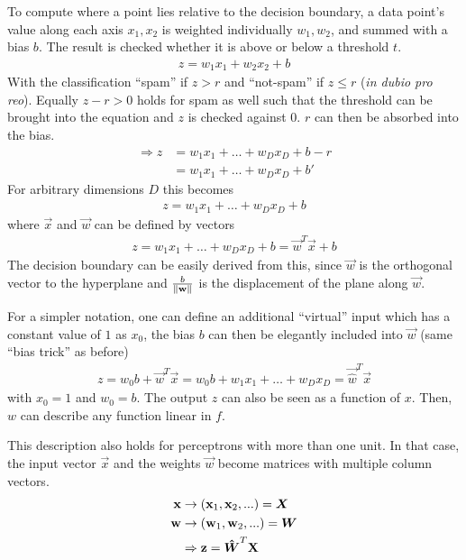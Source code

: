To compute where a point lies relative to the decision boundary, a data point's value along each axis $x_1, x_2$ is weighted individually $w_1, w_2$, and summed with a bias $b$.
The result is checked whether it is above or below a threshold $t$.
\begin{align}
    z = w_1 x_1 + w_2 x_2 + b
\end{align}
With the classification ``spam'' if $z > r$ and ``not-spam'' if $z \leq r$ (\textit{in dubio pro reo}).
Equally $z - r > 0$ holds for spam as well such that the threshold can be brought into the equation and $z$ is checked against $0$.
$r$ can then be absorbed into the bias.
\begin{align}
    \Rightarrow z & = w_1 x_1 + \hdots + w_D x_D + b - r \\
    & = w_1 x_1 + \hdots + w_D x_D + b'
\end{align}
For arbitrary dimensions $D$ this becomes
\begin{align}
    z = w_1 x_1 + \hdots + w_D x_D + b
\end{align}
 where $\vec{x}$ and $\vec{w}$ can be defined by vectors
\begin{align}
    z = w_1 x_1 + \hdots + w_D x_D + b = \vec{w}^T \vec{x} + b
\end{align}
The decision boundary can be easily derived from this, since $\vec{w}$ is the orthogonal vector to the hyperplane and $\frac{b}{\left\lVert\mathbf{w}\right\rVert}$ is the displacement of the plane along $\vec{w}$.

For a simpler notation, one can define an additional ``virtual'' input which has a constant value of $1$ as $x_0$, the bias $b$ can then be elegantly included into $\vec{w}$ (same ``bias trick'' as before)
\begin{align}
    z = w_0 b + \vec{w}^T \vec{x} = w_0 b + w_1 x_1 + \hdots + w_D x_D = \vec{\hat{w}}^T \vec{x}
\end{align}
with $x_0 = 1$ and $w_0 = b$.
The output $z$ can also be seen as a function of $x$.
Then, $w$ can describe any function linear in $f$.

This description also holds for perceptrons with more than one unit.
In that case, the input vector $\vec{x}$ and the weights $\vec{w}$ become matrices with multiple column vectors.
\begin{align}
    \mathbf{x} & \rightarrow (\mathbf{x}_1, \mathbf{x}_2, ...) = \boldsymbol{X} \\
    \mathbf{w} & \rightarrow (\mathbf{w}_1, \mathbf{w}_2, ...) = \boldsymbol{W} \\
    & \Rightarrow \mathbf{z} = \boldsymbol{\hat{W}}^T \mathbf{X}
\end{align}


